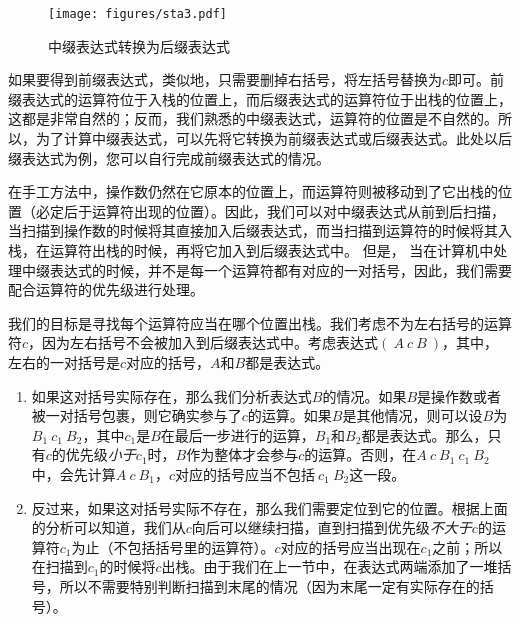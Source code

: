 \begin{figure}
  \centering
  \texttt{[image: figures/sta3.pdf]}
  \caption{中缀表达式转换为后缀表达式}
  \label{fig:sta3}
\end{figure}


如果要得到前缀表达式，类似地，只需要删掉右括号，将左括号替换为$c$即可。前缀表达式的运算符位于入栈的位置上，而后缀表达式的运算符位于出栈的位置上，这都是非常自然的；反而，我们熟悉的中缀表达式，运算符的位置是不自然的。所以，为了计算中缀表达式，可以先将它转换为前缀表达式或后缀表达式。此处以后缀表达式为例，您可以自行完成前缀表达式的情况。

在手工方法中，操作数仍然在它原本的位置上，而运算符则被移动到了它出栈的位置（必定后于运算符出现的位置）。因此，我们可以对中缀表达式从前到后扫描，当扫描到操作数的时候将其直接加入后缀表达式，而当扫描到运算符的时候将其入栈，在运算符出栈的时候，再将它加入到后缀表达式中。
但是，
当在计算机中处理中缀表达式的时候，并不是每一个运算符都有对应的一对括号，因此，我们需要配合运算符的优先级进行处理。



我们的目标是寻找每个运算符应当在哪个位置出栈。我们考虑不为左右括号的运算符$c$，因为左右括号不会被加入到后缀表达式中。考虑表达式$(\ A\ c\ B\ )$，其中，左右的一对括号是$c$对应的括号，$A$和$B$都是表达式。

\begin{enumerate}
    \item 如果这对括号实际存在，那么我们分析表达式$B$的情况。如果$B$是操作数或者被一对括号包裹，则它确实参与了$c$的运算。如果$B$是其他情况，则可以设$B$为$B_1\ c_1\ B_2$，其中$c_1$是$B$在最后一步进行的运算，$B_1$和$B_2$都是表达式。那么，只有$c$的优先级\textit{小于}$c_1$时，$B$作为整体才会参与$c$的运算。否则，在$A\ c\ B_1\ c_1\ B_2$中，会先计算$A\ c\ B_1$，$c$对应的括号应当不包括$\ c_1\ B_2$这一段。
    \item 反过来，如果这对括号实际不存在，那么我们需要定位到它的位置。根据上面的分析可以知道，我们从$c$向后可以继续扫描，直到扫描到优先级\textit{不大于}$c$的运算符$c_1$为止（不包括括号里的运算符）。$c$对应的括号应当出现在$c_1$之前；所以在扫描到$c_1$的时候将$c$出栈。由于我们在上一节中，在表达式两端添加了一堆括号，所以不需要特别判断扫描到末尾的情况（因为末尾一定有实际存在的括号）。
\end{enumerate}

